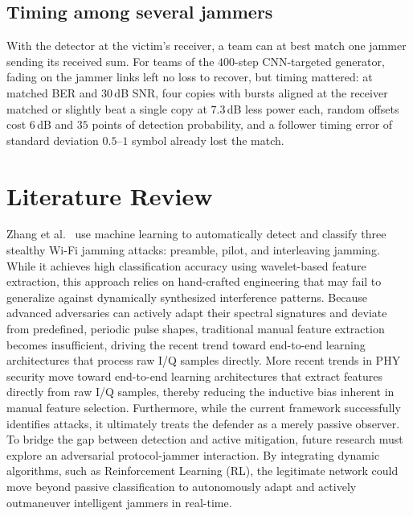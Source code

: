 \documentclass[conference]{IEEEtran}
\newcommand{\adm}[1]{{\color{orange}{[#1]}}}
\newcommand{\rar}[1]{{\color{blue}{[#1]}}}
\begin{document}
\subsection{Timing among several jammers}
With the detector at the victim's receiver, a team can at best match one jammer sending its received sum.
For teams of the $400$-step CNN-targeted generator, fading on the jammer links left no loss to recover, but timing mattered: at matched BER and $30$\,dB SNR, four copies with bursts aligned at the receiver matched or slightly beat a single copy at $7.3$\,dB less power each, random offsets cost $6$\,dB and $35$ points of detection probability, and a follower timing error of standard deviation $0.5$--$1$ symbol already lost the match.


\section{Literature Review}
Zhang et al.~ use machine learning to automatically detect and classify three stealthy Wi-Fi jamming attacks: preamble, pilot, and interleaving jamming.
While it achieves high classification accuracy using wavelet-based feature extraction, this approach relies on hand-crafted engineering that may fail to generalize against %
dynamically synthesized interference patterns. 
Because advanced adversaries can actively adapt their spectral signatures and deviate from predefined, periodic pulse shapes, traditional manual feature extraction becomes insufficient, driving the recent trend toward end-to-end learning architectures that process raw I/Q samples directly.
More recent trends in PHY security move toward end-to-end learning architectures that extract features directly from raw I/Q samples, thereby reducing the inductive bias inherent in manual feature selection. 
Furthermore, while the current framework successfully identifies attacks, it ultimately treats the defender as a merely passive observer.
To bridge the gap between detection and active mitigation, future research must explore an adversarial protocol-jammer interaction.
By integrating dynamic algorithms, such as Reinforcement Learning (RL), the legitimate network could move beyond passive classification to autonomously adapt and actively outmaneuver intelligent jammers in real-time.
\rar{more of jamming detection, we want to focus on jamming attacks}
\end{document}
